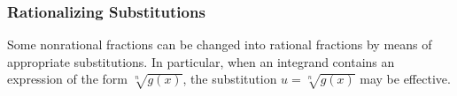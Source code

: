 \begin{frame}
\frametitle{Rationalizing Substitutions}
Some nonrational fractions can be changed into rational fractions by means of appropriate substitutions.  In particular, when an integrand contains an expression of the form $\sqrt[n]{g(x)}$, the substitution $u = \sqrt[n]{g(x)}$ may be effective.
\end{frame}
